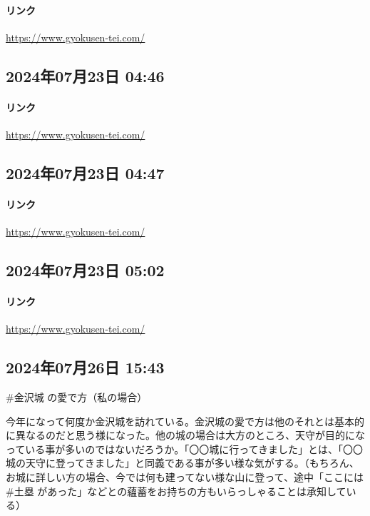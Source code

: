 \paragraph{リンク}
\url{https://www.gyokusen-tei.com/}

\subsection*{2024年07月23日 04:46}

\paragraph{リンク}
\url{https://www.gyokusen-tei.com/}

\subsection*{2024年07月23日 04:47}

\paragraph{リンク}
\url{https://www.gyokusen-tei.com/}

\subsection*{2024年07月23日 05:02}

\paragraph{リンク}
\url{https://www.gyokusen-tei.com/}

\subsection*{2024年07月26日 15:43}

\#金沢城 の愛で方（私の場合）

今年になって何度か金沢城を訪れている。金沢城の愛で方は他のそれとは基本的に異なるのだと思う様になった。他の城の場合は大方のところ、天守が目的になっている事が多いのではないだろうか。「〇〇城に行ってきました」とは、「〇〇城の天守に登ってきました」と同義である事が多い様な気がする。（もちろん、お城に詳しい方の場合、今では何も建ってない様な山に登って、途中「ここには \#土塁 があった」などとの蘊蓄をお持ちの方もいらっしゃることは承知している）

